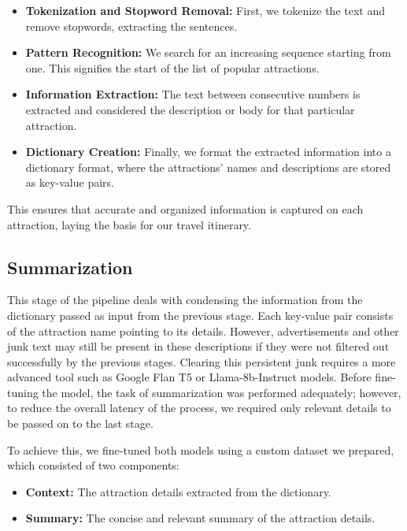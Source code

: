 \documentclass[final,1p,times]{elsarticle}
\begin{document}
        \begin{itemize}
            \item \textbf{Tokenization and Stopword Removal:} First, we tokenize the text and remove stopwords, extracting the sentences.
            
            \item \textbf{Pattern Recognition:} We search for an increasing sequence starting from one. This signifies the start of the list of popular attractions.
            
            \item \textbf{Information Extraction:} The text between consecutive numbers is extracted and considered the description or body for that particular attraction.
            
            \item \textbf{Dictionary Creation:} Finally, we format the extracted information into a dictionary format, where the attractions' names and descriptions are stored as key-value pairs.
        \end{itemize}
        
        This ensures that accurate and organized information is captured on each attraction, laying the basis for our travel itinerary.
    
    \subsection{Summarization}
        This stage of the pipeline deals with condensing the information from the dictionary passed as input from the previous stage. Each key-value pair consists of the attraction name pointing to its details. However, advertisements and other junk text may still be present in these descriptions if they were not filtered out successfully by the previous stages. Clearing this persistent junk requires a more advanced tool such as Google Flan T5 or Llama-8b-Instruct models. Before fine-tuning the model, the task of summarization was performed adequately; however, to reduce the overall latency of the process, we required only relevant details to be passed on to the last stage.
        
        To achieve this, we fine-tuned both models using a custom dataset we prepared, which consisted of two components:
        
        \begin{itemize}
          \item \textbf{Context:} The attraction details extracted from the dictionary.
          \item \textbf{Summary:} The concise and relevant summary of the attraction details.
        \end{itemize}
        
\end{document}
